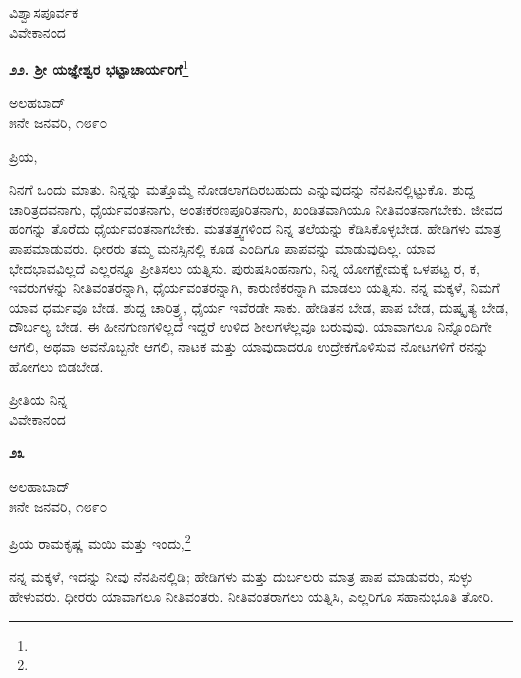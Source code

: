 {\flushright
ವಿಶ್ವಾಸಪೂರ್ವಕ\\ವಿವೇಕಾನಂದ\par}

\newpage

\begin{center}
\textbf{೨೨. ಶ‍್ರೀ ಯಜ್ಞೇಶ್ವರ ಭಟ್ಟಾಚಾರ್ಯರಿಗೆ}\footnote{}
\end{center}

\begin{flushright}
ಅಲಹಬಾದ್\\೫ನೇ ಜನವರಿ, ೧೮೯೦
\end{flushright}

\noindent
ಪ್ರಿಯ,

ನಿನಗೆ ಒಂದು ಮಾತು. ನಿನ್ನನ್ನು ಮತ್ತೊಮ್ಮೆ ನೋಡಲಾಗದಿರಬಹುದು ಎನ್ನುವುದನ್ನು ನೆನಪಿನಲ್ಲಿಟ್ಟುಕೊ. ಶುದ್ದ ಚಾರಿತ್ರದವನಾಗು, ಧೈರ್ಯವಂತನಾಗು, ಅಂತಃಕರಣಪೂರಿತನಾಗು, ಖಂಡಿತವಾಗಿಯೂ ನೀತಿವಂತನಾಗಬೇಕು. ಜೀವದ ಹಂಗನ್ನು ತೊರೆದು ಧೈರ್ಯವಂತನಾಗಬೇಕು. ಮತತತ್ತ್ವಗಳಿಂದ ನಿನ್ನ ತಲೆಯನ್ನು ಕೆಡಿಸಿಕೊಳ್ಳಬೇಡ. ಹೇಡಿಗಳು ಮಾತ್ರ ಪಾಪಮಾಡುವರು. ಧೀರರು ತಮ್ಮ ಮನಸ್ಸಿನಲ್ಲಿ ಕೂಡ ಎಂದಿಗೂ ಪಾಪವನ್ನು ಮಾಡುವುದಿಲ್ಲ. ಯಾವ ಭೇದಭಾವವಿಲ್ಲದೆ ಎಲ್ಲರನ್ನೂ ಪ್ರೀತಿಸಲು ಯತ್ನಿಸು. ಪುರುಷಸಿಂಹನಾಗು, ನಿನ್ನ ಯೋಗಕ್ಷೇಮಕ್ಕೆ ಒಳಪಟ್ಟ ರ\enginline{-}, ಕ\enginline{-}, ಇವರುಗಳನ್ನು ನೀತಿವಂತರನ್ನಾಗಿ, ಧೈರ್ಯವಂತರನ್ನಾಗಿ, ಕಾರುಣಿಕರನ್ನಾಗಿ ಮಾಡಲು ಯತ್ನಿಸು. ನನ್ನ ಮಕ್ಕಳೆ, ನಿಮಗೆ ಯಾವ ಧರ್ಮವೂ ಬೇಡ. ಶುದ್ದ ಚಾರಿತ್ರ್ಯ, ಧೈರ್ಯ ಇವೆರಡೇ ಸಾಕು. ಹೇಡಿತನ ಬೇಡ, ಪಾಪ ಬೇಡ, ದುಷ್ಕೃತ್ಯ ಬೇಡ, ದೌರ್ಬಲ್ಯ ಬೇಡ. ಈ ಹೀನಗುಣಗಳಿಲ್ಲದೆ ಇದ್ದರೆ ಉಳಿದ ಶೀಲಗಳೆಲ್ಲವೂ ಬರುವುವು. ಯಾವಾಗಲೂ ನಿನ್ನೊಂದಿಗೇ ಆಗಲಿ, ಅಥವಾ ಅವನೊಬ್ಬನೇ ಆಗಲಿ, ನಾಟಕ ಮತ್ತು ಯಾವುದಾದರೂ ಉದ್ರೇಕಗೊಳಿಸುವ ನೋಟಗಳಿಗೆ ರ\enginline{-}ನನ್ನು ಹೋಗಲು ಬಿಡಬೇಡ.

\vspace{-0.5cm}

{\flushright
ಪ್ರೀತಿಯ ನಿನ್ನ\\ವಿವೇಕಾನಂದ\par}

\begin{center}
\textbf{೨೩}
\end{center}


\vspace{-0.5cm}

\begin{flushright}
ಅಲಹಾಬಾದ್\\೫ನೇ ಜನವರಿ, ೧೮೯೦
\end{flushright}

\noindent
ಪ್ರಿಯ ರಾಮಕೃಷ್ಣ ಮಯಿ ಮತ್ತು ಇಂದು,\footnote{}

ನನ್ನ ಮಕ್ಕಳೆ, ಇದನ್ನು ನೀವು ನೆನಪಿನಲ್ಲಿಡಿ; ಹೇಡಿಗಳು ಮತ್ತು ದುರ್ಬಲರು ಮಾತ್ರ ಪಾಪ ಮಾಡುವರು, ಸುಳ್ಳು ಹೇಳುವರು. ಧೀರರು ಯಾವಾಗಲೂ ನೀತಿವಂತರು. ನೀತಿವಂತರಾಗಲು ಯತ್ನಿಸಿ, ಎಲ್ಲರಿಗೂ ಸಹಾನುಭೂತಿ ತೋರಿ.

